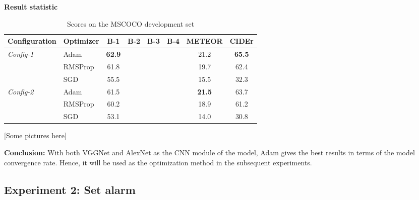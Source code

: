 \textbf{Result statistic}
\begin{table}
	\centering
	\begin{tabular}{llcccccc}
		\toprule
		Configuration & Optimizer & B-1 & B-2 & B-3 & B-4 & METEOR & CIDEr \\ \midrule
		\multirow{3}{*}{\textit{Config-1}} & Adam & \textbf{62.9} & & & & 21.2 & \textbf{65.5} \\
		 & RMSProp & 61.8 & & & & 19.7 & 62.4 \\
		 & SGD & 55.5 & & & & 15.5 & 32.3 \\
		 \midrule
		 \multirow{3}{*}{\textit{Config-2}} & Adam & 61.5 & & & &\textbf{21.5} & 63.7 \\
		 & RMSProp & 60.2 & & & & 18.9 & 61.2 \\
		 & SGD & 53.1 & & & & 14.0 & 30.8 \\
		 \bottomrule
	\end{tabular}
	\caption{Scores on the MSCOCO development set}
	\label{tab:exp1}
\end{table}

[Some pictures here]

\textbf{Conclusion:} With both VGGNet and AlexNet as the CNN module of the model, Adam gives the best results in terms of the model convergence rate. Hence, it will be used as the optimization method in the subsequent experiments.

\subsection{Experiment 2: Set alarm}
